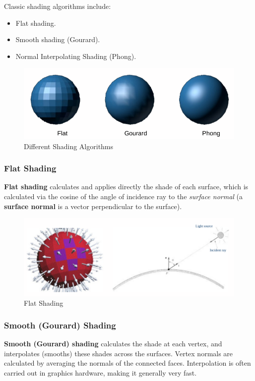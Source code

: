 \documentclass[a4paper,11pt]{article}
\begin{document}
Classic shading algorithms include:
\begin{itemize}
    \item   Flat shading.
    \item   Smooth shading (Gourard).
    \item   Normal Interpolating Shading (Phong).
\end{itemize}

\begin{figure}[H]
    \centering
    \includegraphics[width=\textwidth]{images/shading_algs.png}
    \caption{Different Shading Algorithms}
\end{figure}

\subsubsection{Flat Shading}
\textbf{Flat shading} calculates and applies directly the shade of each surface, which is calculated via the cosine of the angle
of incidence ray to the \textit{surface normal} (a \textbf{surface normal} is a vector perpendicular to the surface).

\begin{figure}[H]
    \centering
    \includegraphics[width=\textwidth]{images/flat_shading.png}
    \caption{Flat Shading}
\end{figure}

\subsubsection{Smooth (Gourard) Shading}
\textbf{Smooth (Gourard) shading} calculates the shade at each vertex, and interpolates (smooths) these shades across the 
surfaces.
Vertex normals are calculated by averaging the normals of the connected faces.
Interpolation is often carried out in graphics hardware, making it generally very fast.
\end{document}

